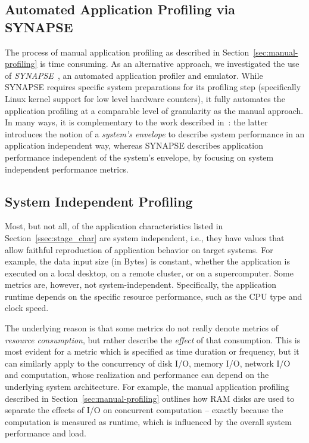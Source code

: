 \documentclass[preprint,12pt]{elsarticle}
\newcommand{\amnote}[1]{{\textcolor{magenta}    { ***Andre: #1 }}}
\newcommand{\jhanote}[1]{{\textcolor{green}    { ***Shantenu: #1 }}}
\newcommand{\amnote}[1]{}
\newcommand{\jhanote}[1]{}
\newcommand{\I}[1]{\textit{#1}\xspace}
\begin{document}
\subsection{Automated Application Profiling via SYNAPSE}

The process of manual application profiling as described in
Section~\ref{sec:manual-profiling} is time consuming.  As an alternative
approach, we investigated the use of \I{SYNAPSE}~\cite{review_synapse_wrap,
  synapse-software}, an automated application profiler and emulator.  While
SYNAPSE requires specific system preparations for its profiling step
(specifically Linux kernel support for low level hardware counters), it fully
automates the application profiling at a comparable level of granularity as the
manual approach.  In many ways, it is complementary to the work described
in~\cite{ENVELOPE}: the latter introduces the notion of a \I{system's 
envelope} to describe  system performance in an
application independent way, whereas SYNAPSE describes application performance
independent of the system's envelope, by focusing on system
independent performance metrics. 
%


\subsection{System Independent Profiling}
\label{ssec:si_profiling}

Most, but not all, of the application characteristics listed in
Section~\ref{ssec:stage_char} are system independent, i.e., they have values
that allow faithful reproduction of application behavior on target systems.  For
example, the data input size (in Bytes) is constant, whether the application is
executed on a local desktop, on a remote cluster, or on a supercomputer.  Some
metrics are, however, not system-independent.  Specifically, the application
runtime depends on the specific resource performance, such as the CPU type and
clock speed.

The underlying reason is that some metrics do not really denote metrics of
\I{resource consumption}, but rather describe the \I{effect} of that
consumption.  This is most evident for a metric which is specified as time
duration or frequency, but it can similarly apply to the concurrency of disk
I/O, memory I/O, network I/O and computation, whose realization and performance
can depend on the underlying system architecture.  For example, the manual
application profiling described in Section~\ref{sec:manual-profiling} outlines
how RAM disks are used to separate the effects of I/O on concurrent computation
-- exactly because the computation is measured as runtime, which is influenced
by the overall system performance and load.
\end{document}
